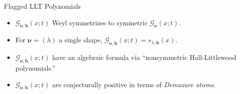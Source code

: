 \documentclass[dvipsnames]{beamer}
\newcommand{\xx}{x}%
\newcommand{\Gcal}{{\mathcal G}}
\newcommand{\nubold}{{\boldsymbol \nu }}
\newcommand{\bb}{{\mathbf b}}
\theoremstyle{definition}
\newcounter{c}
\begin{document}
\begin{frame}{Flagged LLT Polynomials}
  \begin{itemize}
  \item \(\Gcal_{\nubold,\bb}(x;t)\) Weyl symmetrizes to symmetric
    \(\Gcal_\nubold(\xx;t)\).\pause
  \item For \(\nubold = (\lambda)\) a single shape, \(\Gcal_{\nubold,\bb}(x;t) = s_{\lambda,\bb}(x)\).\pause
  \item \(\Gcal_{\nubold,\bb}(x;t)\) have an algebraic formula via
    ``nonsymmetric Hall-Littlewood polynomials.'' \pause
  \item \(\Gcal_{\nubold,\bb}(x;t)\) are conjecturally positive in terms
    of \emph{Demazure atoms}.
  \end{itemize}
\end{frame}
\end{document}

